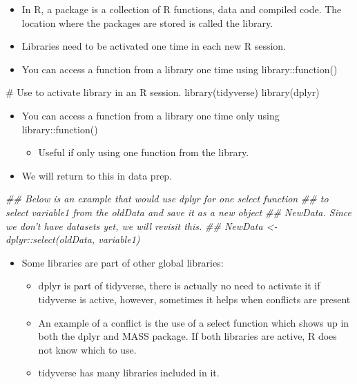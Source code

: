 \documentclass[
  letterpaper,
  DIV=11,
  numbers=noendperiod]{scrreprt}
\newenvironment{Shaded}{\begin{snugshade}}{\end{snugshade}}
\newcommand{\CommentTok}[1]{\textcolor[rgb]{0.37,0.37,0.37}{#1}}
\newcommand{\DocumentationTok}[1]{\textcolor[rgb]{0.37,0.37,0.37}{\textit{#1}}}
\newcommand{\FunctionTok}[1]{\textcolor[rgb]{0.28,0.35,0.67}{#1}}
\newcommand{\NormalTok}[1]{\textcolor[rgb]{0.00,0.23,0.31}{#1}}
\providecommand{\tightlist}{%
  \setlength{\itemsep}{0pt}\setlength{\parskip}{0pt}}\usepackage{longtable,booktabs,array}
\begin{document}
\begin{itemize}
\tightlist
\item
  In R, a package is a collection of R functions, data and compiled
  code. The location where the packages are stored is called the
  library.
\item
  Libraries need to be activated one time in each new R session.
\item
  You can access a function from a library one time using
  library::function()
\end{itemize}

\begin{Shaded}
\begin{Highlighting}[]
\CommentTok{\# Use to activate library in an R session.}
\FunctionTok{library}\NormalTok{(tidyverse)}
\FunctionTok{library}\NormalTok{(dplyr)}
\end{Highlighting}
\end{Shaded}

\begin{itemize}
\tightlist
\item
  You can access a function from a library one time only using
  library::function()

  \begin{itemize}
  \tightlist
  \item
    Useful if only using one function from the library.
  \end{itemize}
\item
  We will return to this in data prep.
\end{itemize}

\begin{Shaded}
\begin{Highlighting}[]
\DocumentationTok{\#\# Below is an example that would use dplyr for one select function}
\DocumentationTok{\#\# to select variable1 from the oldData and save it as a new object}
\DocumentationTok{\#\# NewData. Since we don’t have datasets yet, we will revisit this.}
\DocumentationTok{\#\# NewData \textless{}{-} dplyr::select(oldData, variable1)}
\end{Highlighting}
\end{Shaded}

\begin{itemize}
\tightlist
\item
  Some libraries are part of other global libraries:

  \begin{itemize}
  \tightlist
  \item
    dplyr is part of tidyverse, there is actually no need to activate it
    if tidyverse is active, however, sometimes it helps when conflicts
    are present
  \item
    An example of a conflict is the use of a select function which shows
    up in both the dplyr and MASS package. If both libraries are active,
    R does not know which to use.
  \item
    tidyverse has many libraries included in it.
  \end{itemize}
\end{itemize}
\end{document}
